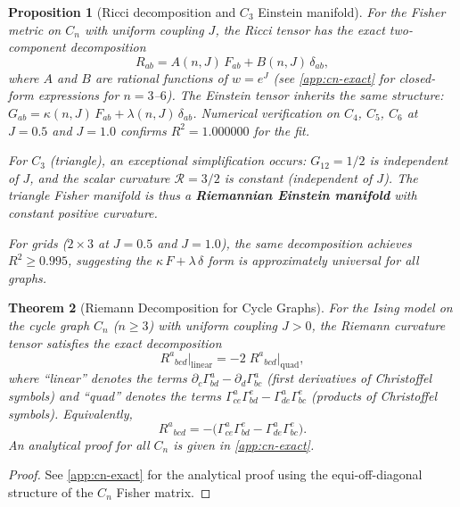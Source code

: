 \documentclass[11pt]{article}
\newtheorem{theorem}{Theorem}[section]
\newtheorem{proposition}[theorem]{Proposition}
\theoremstyle{definition}
\theoremstyle{remark}
\newcommand{\Fish}{F}
\newcommand{\Chr}[2]{\Gamma^{#1}_{#2}}
\newcommand{\Ein}{G}
\newcommand{\Ric}{R}
\newcommand{\Scal}{\mathcal{R}}
\begin{document}
\begin{proposition}[Ricci decomposition and $C_3$ Einstein manifold]
\label{prop:ricci-decomp}
For the Fisher metric on $C_n$ with uniform coupling $J$, the Ricci
tensor has the exact two-component decomposition
\begin{equation}
  \Ric_{ab} = A(n, J)\,\Fish_{ab} + B(n, J)\,\delta_{ab},
\end{equation}
where $A$ and $B$ are rational functions of $w = e^J$ (see
\cref{app:cn-exact} for closed-form expressions for $n = 3$--$6$).
The Einstein tensor inherits the same structure:
$\Ein_{ab} = \kappa(n, J)\,\Fish_{ab} + \lambda(n, J)\,\delta_{ab}$.
Numerical verification on $C_4$, $C_5$, $C_6$ at $J = 0.5$ and $J = 1.0$
confirms $R^2 = 1.000000$ for the fit.

For $C_3$ (triangle), an exceptional simplification occurs:
$G_{12} = 1/2$ is \emph{independent of $J$}, and the scalar curvature
$\Scal = 3/2$ is \emph{constant} (independent of $J$). The triangle
Fisher manifold is thus a \textbf{Riemannian Einstein manifold} with
constant positive curvature.

For grids ($2 \times 3$ at $J = 0.5$ and $J = 1.0$), the same
decomposition achieves $R^2 \geq 0.995$, suggesting the
$\kappa\,\Fish + \lambda\,\delta$ form is approximately universal
for all graphs.
\end{proposition}

\begin{theorem}[Riemann Decomposition for Cycle Graphs]
\label{thm:riem-decomp}
For the Ising model on the cycle graph $C_n$ ($n \geq 3$) with uniform
coupling $J > 0$, the Riemann curvature tensor satisfies the exact
decomposition
\begin{equation}
  \Ric^a{}_{bcd}\big|_{\mathrm{linear}} = -2\;\Ric^a{}_{bcd}\big|_{\mathrm{quad}},
  \label{eq:riem-decomp}
\end{equation}
where ``linear'' denotes the terms $\partial_c \Chr{a}{bd} - \partial_d \Chr{a}{bc}$
(first derivatives of Christoffel symbols) and ``quad'' denotes the terms
$\Chr{a}{ce}\Chr{e}{bd} - \Chr{a}{de}\Chr{e}{bc}$ (products of Christoffel
symbols). Equivalently,
\begin{equation}
  \Ric^a{}_{bcd} = -\bigl(\Chr{a}{ce}\Chr{e}{bd} - \Chr{a}{de}\Chr{e}{bc}\bigr).
  \label{eq:riem-quad-only}
\end{equation}
An analytical proof for all $C_n$ is given in \cref{app:cn-exact}.
\end{theorem}

\begin{proof}
See \cref{app:cn-exact} for the analytical proof using the equi-off-diagonal
structure of the $C_n$ Fisher matrix.
\end{proof}
\end{document}
